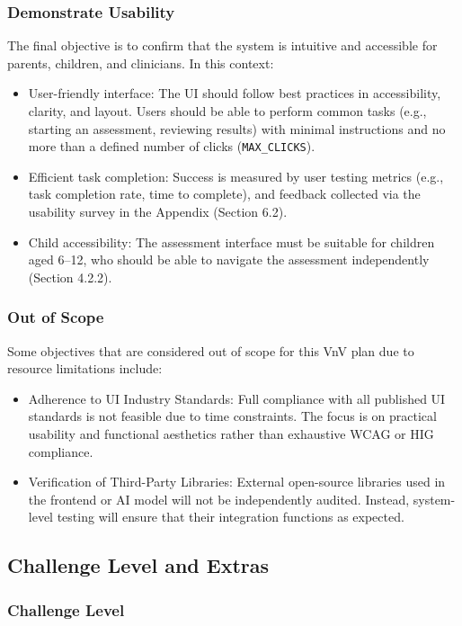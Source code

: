 \documentclass[12pt, titlepage]{article}
\begin{document}
\subsubsection{Demonstrate Usability}
The final objective is to confirm that the system is intuitive and accessible for parents, children, and clinicians. In this context:
\begin{itemize}
  \item User-friendly interface: The UI should follow best practices in accessibility, clarity, and layout. Users should be able to perform common tasks (e.g., starting an assessment, reviewing results) with minimal instructions and no more than a defined number of clicks (\texttt{MAX\_CLICKS}).
  \item Efficient task completion: Success is measured by user testing metrics (e.g., task completion rate, time to complete), and feedback collected via the usability survey in the Appendix (Section 6.2).
  \item Child accessibility: The assessment interface must be suitable for children aged 6–12, who should be able to navigate the assessment independently (Section 4.2.2).
\end{itemize}

\subsubsection*{Out of Scope}
Some objectives that are considered out of scope for this VnV plan due to resource limitations include:
\begin{itemize}
  \item Adherence to UI Industry Standards: Full compliance with all published UI standards is not feasible due to time constraints. The focus is on practical usability and functional aesthetics rather than exhaustive WCAG or HIG compliance.
  \item Verification of Third-Party Libraries: External open-source libraries used in the frontend or AI model will not be independently audited. Instead, system-level testing will ensure that their integration functions as expected.
\end{itemize}
  
\subsection{Challenge Level and Extras}

\subsubsection{Challenge Level} 
\end{document}
